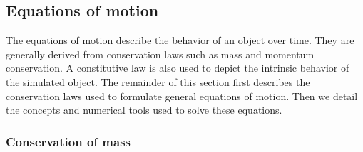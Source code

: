 \subsection{Equations of motion}

The equations of motion describe the behavior of an object over time.
They are generally derived from conservation laws such as mass and momentum conservation. 
A constitutive law is also used to depict the intrinsic behavior of the simulated object.
The remainder of this section first describes the conservation laws used to formulate general equations of motion.
Then we detail the concepts and numerical tools used to solve these equations.

\subsubsection{Conservation of mass}

